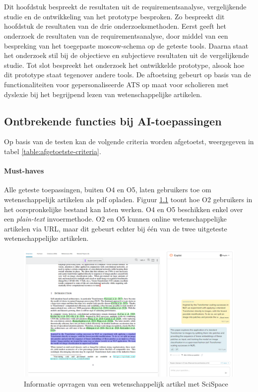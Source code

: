 \chapter{}%
\label{ch:resultaten}

Dit hoofdstuk bespreekt de resultaten uit de requirementsanalyse, vergelijkende studie en de ontwikkeling van het prototype besproken. Zo bespreekt dit hoofdstuk de resultaten van de drie onderzoeksmethoden. Eerst geeft het onderzoek de resultaten van de requirementsanalyse, door middel van een bespreking van het toegepaste moscow-schema op de geteste tools. Daarna staat het onderzoek stil bij de objectieve en subjectieve resultaten uit de vergelijkende studie. Tot slot bespreekt het onderzoek het ontwikkelde prototype, alsook hoe dit prototype staat tegenover andere tools. De aftoetsing gebeurt op basis van de functionaliteiten voor gepersonaliseerde ATS op maat voor scholieren met dyslexie bij het begrijpend lezen van wetenschappelijke artikelen. 

\section{Ontbrekende functies bij AI-toepassingen}

Op basis van de testen kan de volgende criteria worden afgetoetst, weergegeven in tabel \ref{table:afgetoetste-criteria}.

\subsubsection{Must-haves}

Alle geteste toepassingen, buiten O4 en O5, laten gebruikers toe om wetenschappelijk artikelen als pdf opladen. Figuur \ref{img:scispace-example} toont hoe O2 gebruikers in het oorspronkelijke bestand kan laten werken. O4 en O5 beschikken enkel over een \textit{plain-text} invoermethode. O2 en O5 kunnen online wetenschappelijke artikelen via URL, maar dit gebeurt echter bij één van de twee uitgeteste wetenschappelijke artikelen.

\begin{figure}[H]
	\includegraphics{img/typeset-example.png}
	\caption{Informatie opvragen van een wetenschappelijk artikel met SciSpace}
	\label{img:scispace-example}
\end{figure}

